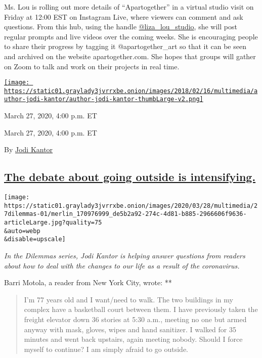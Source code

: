 Ms. Lou is rolling out more details of ``Apartogether'' in a virtual
studio visit on Friday at 12:00 EST on Instagram Live, where viewers can
comment and ask questions. From this hub, using the handle
\href{https://www.instagram.com/liza_lou_studio/?hl=en}{@liza\_lou\_studio},
she will post regular prompts and live videos over the coming weeks. She
is encouraging people to share their progress by tagging it
@apartogether\_art so that it can be seen and archived on the website
apartogether.com. She hopes that groups will gather on Zoom to talk and
work on their projects in real time.

\href{https://www.nytimes3xbfgragh.onion/by/jodi-kantor}{\texttt{[image: https://static01.graylady3jvrrxbe.onion/images/2018/02/16/multimedia/author-jodi-kantor/author-jodi-kantor-thumbLarge-v2.png]}}

March 27, 2020, 4:00 p.m. ET

March 27, 2020, 4:00 p.m. ET

By \href{https://www.nytimes3xbfgragh.onion/by/jodi-kantor}{Jodi Kantor}

\hypertarget{the-debate-about-going-outside-is-intensifying}{%
\subsection{\texorpdfstring{\protect\hyperlink{the-debate-about-going-outside-is-intensifying}{The
debate about going outside is
intensifying.}}{The debate about going outside is intensifying.}}\label{the-debate-about-going-outside-is-intensifying}}

\texttt{[image: https://static01.graylady3jvrrxbe.onion/images/2020/03/28/multimedia/27dilemmas-01/merlin\_170976999\_de5b2a92-274c-4d81-b885-2966606f9636-articleLarge.jpg?quality=75\\\&auto=webp\\\&disable=upscale]}

\emph{In the Dilemmas series, Jodi Kantor is helping answer questions
from readers about how to deal with the changes to our life as a result
of the coronavirus.}

Barri Motola, a reader from New York City, wrote: **

\begin{quote}
I'm 77 years old and I want/need to walk. The two buildings in my
complex have a basketball court between them. I have previously taken
the freight elevator down 36 stories at 5:30 a.m., meeting no one but
armed anyway with mask, gloves, wipes and hand sanitizer. I walked for
35 minutes and went back upstairs, again meeting nobody. Should I force
myself to continue? I am simply afraid to go outside.
\end{quote}

